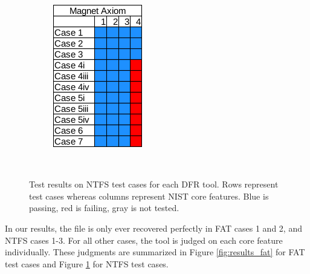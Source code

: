 \begin{figure}[h]
\begin{subfigure}{0.17\linewidth}
        \includegraphics[width=\linewidth]{fig/axiom_results_ntfs.png}
    \end{subfigure}~~
        
    \caption{Test results on NTFS test cases for each DFR tool. Rows represent test cases whereas columns represent NIST core features. Blue is passing, red is failing, gray is not tested.}
    \label{fig:results_ntfs}
\end{figure}

In our results, the file is only ever recovered perfectly in FAT cases 1 and 2, and NTFS cases 1-3. 
For all other cases, the tool is judged on each core feature individually. 
These judgments are summarized in Figure \ref{fig:results_fat} for FAT test cases and Figure \ref{fig:results_ntfs} for NTFS test cases.



